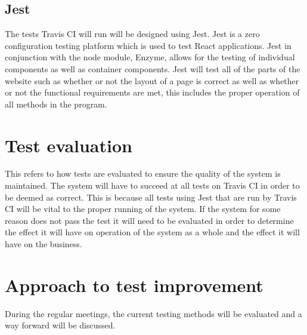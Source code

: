 \documentclass[a4paper]{article}
\begin{document}
	\subsection{Jest}
The tests Travis CI will run will be designed using Jest. Jest is a zero configuration testing platform which is used to test React applications. Jest in conjunction with the node module, Enzyme, allows for the testing of individual components as well as container components. Jest will test all of the parts of the website such as whether or not the layout of a page is correct as well as whether or not the functional requirements are met, this includes the proper operation of all methods in the program.
    
\section{Test evaluation}
This refers to how tests are evaluated to ensure the quality of the system is maintained. The system will have to succeed at all tests on Travis CI in order to be deemed as correct. This is because all tests using Jest that are run by Travis CI will be vital to the proper running of the system.
\newline
\newline
If the system for some reason does not pass the test it will need to be evaluated in order to determine the effect it will have on operation of the system as a whole and the effect it will have on the business.

\section{Approach to test improvement}
During the regular meetings, the current testing methods will be evaluated and a way forward will be discussed.
\end{document}
